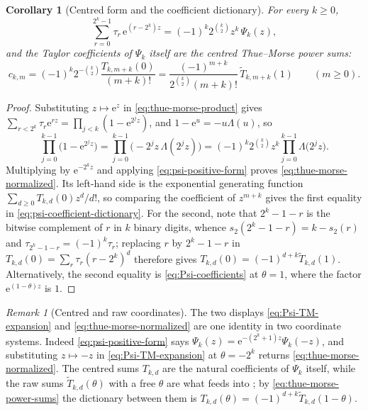 \documentclass[11pt,oneside,openany]{book}
\newtheorem{corollary}[corollary]{Corollary}
\theoremstyle{definition}
\theoremstyle{remark}
\newtheorem{remark}[remark]{Remark}
\newcommand{\e}{\mathrm e}
\begin{document}
\begin{corollary}[Centred form and the coefficient dictionary]\label{prop:psi-normalization}
For every $k\ge0$,
\begin{equation}\label{eq:thue-morse-normalized}
 \sum_{r=0}^{2^k-1}\tau_r\,\e^{(r-2^k)z}
 =(-1)^k2^{\binom k2}z^k\,\Psi_k(z),
\end{equation}
and the Taylor coefficients of $\Psi_k$ itself are the centred Thue--Morse power sums:
\begin{equation}\label{eq:psi-coefficient-dictionary}
 c_{k,m}
 =(-1)^k2^{-\binom k2}\frac{T_{k,m+k}(0)}{(m+k)!}
 =\frac{(-1)^{m+k}}{2^{\binom k2}(m+k)!}\,\widetilde T_{k,m+k}(1)
 \qquad(m\ge0).
\end{equation}
\end{corollary}

\begin{proof}
Substituting $z\mapsto\e^{z}$ in \eqref{eq:thue-morse-product} gives
$\sum_{r<2^k}\tau_r\e^{rz}=\prod_{j<k}(1-\e^{2^jz})$, and $1-\e^{u}=-u\Lambda(u)$, so
\[
 \prod_{j=0}^{k-1}\bigl(1-\e^{2^jz}\bigr)
 =\prod_{j=0}^{k-1}\bigl(-2^jz\,\Lambda(2^jz)\bigr)
 =(-1)^k2^{\binom k2}z^k\prod_{j=0}^{k-1}\Lambda\bigl(2^jz\bigr).
\]
Multiplying by $\e^{-2^kz}$ and applying \eqref{eq:psi-positive-form} proves
\eqref{eq:thue-morse-normalized}.  Its left-hand side is the exponential generating
function $\sum_{d\ge0}T_{k,d}(0)z^d/d!$, so comparing the coefficient of $z^{m+k}$ gives
the first equality in \eqref{eq:psi-coefficient-dictionary}.  For the second, note that
$2^k-1-r$ is the bitwise complement of $r$ in $k$ binary digits, whence
$s_2(2^k-1-r)=k-s_2(r)$ and $\tau_{2^k-1-r}=(-1)^k\tau_r$; replacing $r$ by $2^k-1-r$ in
$T_{k,d}(0)=\sum_r\tau_r(r-2^k)^d$ therefore gives
$T_{k,d}(0)=(-1)^{d+k}\widetilde T_{k,d}(1)$.  Alternatively, the second equality is
\eqref{eq:Psi-coefficients} at $\theta=1$, where the factor $\e^{(1-\theta)z}$ is $1$.
\end{proof}

\begin{remark}[Centred and raw coordinates]\label{rem:psi-two-coordinates}
The two displays \eqref{eq:Psi-TM-expansion} and \eqref{eq:thue-morse-normalized} are one
identity in two coordinate systems.  Indeed \eqref{eq:psi-positive-form} says
$\Psi_k(z)=\e^{-(2^k+1)z}\Psi_k(-z)$, and substituting $z\mapsto-z$ in
\eqref{eq:Psi-TM-expansion} at $\theta=-2^k$ returns \eqref{eq:thue-morse-normalized}.
The centred sums $T_{k,d}$ are the natural coefficients of $\Psi_k$ itself, while the raw
sums $\widetilde T_{k,d}(\theta)$ with a free $\theta$ are what
 feeds into ; by
\eqref{eq:thue-morse-power-sums} the dictionary between them is
$T_{k,d}(\theta)=(-1)^{d+k}\widetilde T_{k,d}(1-\theta)$.
\end{remark}
\end{document}
